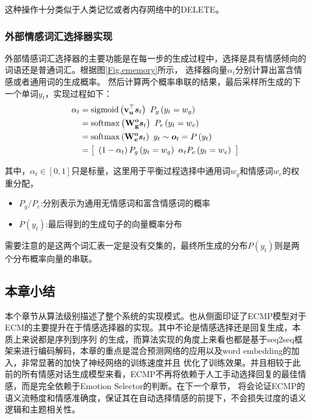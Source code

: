\documentclass[supercite]{HustGraduPaper}
\theoremstyle{definition}
\begin{document}
这种操作十分类似于人类记忆或者内存网络中的DELETE\cite{miller1956human}。

\subsubsection{外部情感词汇选择器实现}
外部情感词汇选择器的主要功能是在每一步的生成过程中，选择是具有情感倾向的词语还是普通词汇。根据图\ref{Fig.ememory}所示，
选择器向量$\alpha_t$分别计算出富含情感或者通用词的生成概率。
然后计算两个概率串联的结果，最后采样所生成的下一个单词$y_t$，实现过程如下：
\begin{align} 
  \alpha _ { t } \notag
  &= \operatorname { sigmoid } \left( \mathbf { v } _ { \mathbf { u } } ^ { \top } \boldsymbol { s } _ { t } \right) \ P _ { g } \left( y _ { t } = w _ { g } \right) \\\notag
  & = \operatorname { softmax } \left( \mathbf { W } _ { \mathbf { g } } ^ { \mathbf { o } } \boldsymbol { s } _ { t } \right) \ P _ { e } \left( y _ { t } = w _ { e } \right) \\\notag
  & = \operatorname { softmax } \left( \mathbf { W } _ { \mathbf { e } } ^ { \mathbf { o } } \boldsymbol { s } _ { t } \right) \ y _ { t } \sim \boldsymbol { o } _ { t } = P \left( y _ { t } \right) \\\notag
  & = \left[ \begin{array} { c } \left( 1 - \alpha _ { t } \right) P _ { g } \left( y _ { t } = w _ { g } \right) \ \alpha _ { t } P _ { e } \left( y _ { t } = w _ { e } \right) \end{array} \right] \notag
\end{align}

其中，$\alpha_t \in [0,1]$只是标量，这里用于平衡过程选择中通用词$w_g$和情感词$w_e$的权重分配，
\begin{itemize}
  \item $P_g/P_e$:分别表示为通用无情感词和富含情感词的概率
  \item $P(y_t)$:最后得到的生成句子的向量概率分布
\end{itemize}
需要注意的是这两个词汇表一定是没有交集的，最终所生成的分布$P(y_t)$则是两个分布概率向量的串联。

\subsection{本章小结}
本个章节从算法级别描述了整个系统的实现模式。也从侧面印证了ECMP模型对于ECM的主要提升在于情感选择器的实现。其中不论是情感选择还是回复生成，本质上来说都是序列到序列
的生成，而算法实现的角度上来看也都是基于seq2seq框架来进行编码解码，本章的重点是混合预测网络的应用以及word embedding的加入，非常显著的加快了神经网络的训练速度并且
优化了训练效果。并且相较于此前的所有情感对话生成模型来看，ECMP不再将依赖于人工手动选择回复的最佳情感，而是完全依赖于Emotion Selector的判断。在下一个章节，
将会论证ECMP的语义流畅度和情感准确度，保证其在自动选择情感的前提下，不会损失过度的语义逻辑和主题相关性。
\end{document}
